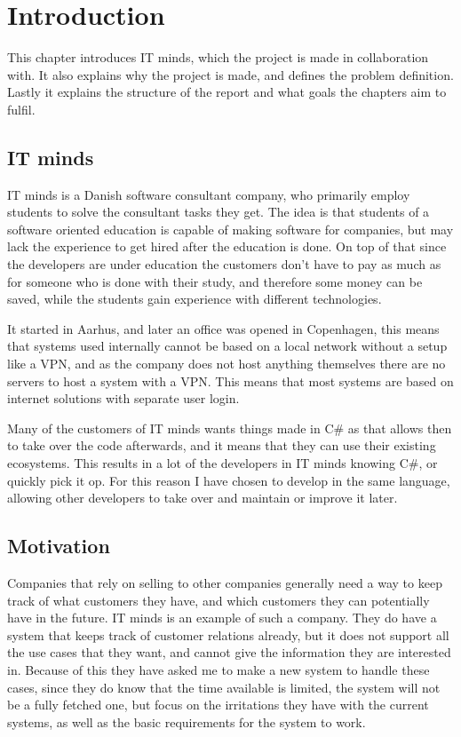\chapter{Introduction}
\label{chap:Introduction}
This chapter introduces IT minds, which the project is made in collaboration
with. It also explains why the project is made, and defines the problem
definition. Lastly it explains the structure of the report and what goals the
chapters aim to fulfil. 

\section{IT minds}
\label{sec:IT minds}
IT minds is a Danish software consultant company\cite{IT-minds}, who primarily
employ students to solve the consultant tasks they get. The idea is that
students of a software oriented education is capable of making software for
companies, but may lack the experience to get hired after the education is done.
On top of that since the developers are under education the customers don't have
to pay as much as for someone who is done with their study, and therefore some
money can be saved, while the students gain experience with different technologies. 

It started in Aarhus, and later an office was opened in Copenhagen, this means
that systems used internally cannot be based on a local network without a setup
like a VPN, and as the company does not host anything themselves there are no
servers to host a system with a VPN. This means that most systems are based on
internet solutions with separate user login. 

Many of the customers of IT minds wants things made in C\# as that allows then
to take over the code afterwards, and it means that they can use their existing
ecosystems. This results in a lot of the developers in IT minds knowing C\#,
or quickly pick it op. For this reason I have chosen to develop in the same
language, allowing other developers to take over and maintain or improve it later. 

\section{Motivation}
\label{sec:Motivation}
Companies that rely on selling to other companies generally need a way to keep
track of what customers they have, and which customers they can potentially have
in the future. IT minds is an example of such a company. They do have a system
that keeps track of customer relations already, but it does not support all the
use cases that they want, and cannot give the information they are interested
in. Because of this they have asked me to make a new system to handle these
cases, since they do know that the time available is limited, the system will
not be a fully fetched one, but focus on the irritations they have with the
current systems, as well as the basic requirements for the system to work. 

